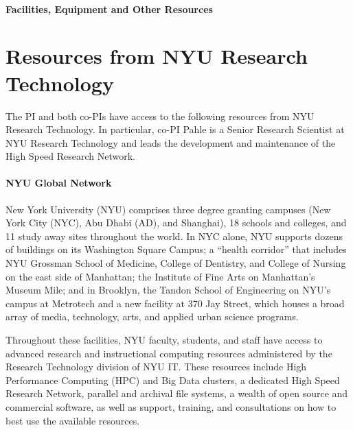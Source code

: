 \begin{center}
    {\large \bf \TITLE} \\
    {\bf Facilities, Equipment and Other Resources}
\end{center}



\section*{Resources from NYU Research Technology}

The PI and both co-PIs have access to the following resources from NYU Research Technology. In particular, co-PI Pahle is a Senior Research Scientist at NYU Research Technology and leads the development and maintenance of the High Speed Research Network.


\paragraph{NYU Global Network}
New York University (NYU) comprises three degree granting campuses (New York City (NYC), Abu Dhabi (AD), and Shanghai), 18 schools and colleges, and 11 study away sites throughout the world. In NYC alone, NYU supports dozens of buildings on its Washington Square Campus; a “health corridor” that includes NYU Grossman School of Medicine, College of Dentistry, and College of Nursing on the east side of Manhattan; the Institute of Fine Arts on Manhattan’s Museum Mile; and in Brooklyn, the Tandon School of Engineering on NYU’s campus at Metrotech and a new facility at 370 Jay Street, which houses a broad array of media, technology, arts, and applied urban science programs.

Throughout these facilities, NYU faculty, students, and staff have access to advanced research and instructional computing resources administered by the Research Technology division of NYU IT. These resources include High Performance Computing (HPC) and Big Data clusters, a dedicated High Speed Research Network, parallel and archival file systems, a wealth of open source and commercial software, as well as support, training, and consultations on how to best use the available resources.



